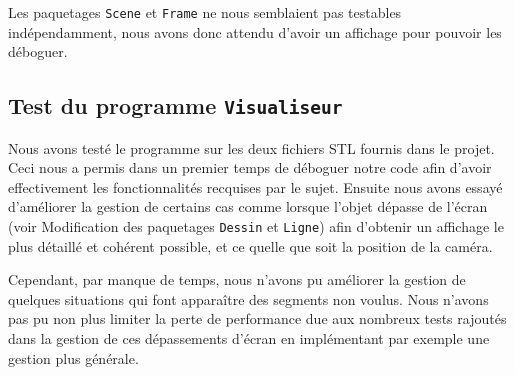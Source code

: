 \documentclass[10pt]{article}
\begin{document}
Les paquetages \lstinline!Scene! et \lstinline!Frame! ne nous semblaient pas testables indépendamment, nous avons donc attendu d'avoir un affichage pour pouvoir les déboguer.

\subsection{Test du programme \lstinline!Visualiseur!}

Nous avons testé le programme sur les deux fichiers STL fournis dans le projet. Ceci nous a permis dans un premier temps de déboguer notre code afin d'avoir effectivement les fonctionnalités recquises par le sujet. Ensuite nous avons essayé d'améliorer la gestion de certains cas comme lorsque l'objet dépasse de l'écran (voir Modification des paquetages \lstinline!Dessin! et \lstinline!Ligne!) afin d'obtenir un affichage le plus détaillé et cohérent possible, et ce quelle que soit la position de la caméra.

Cependant, par manque de temps, nous n'avons pu améliorer la gestion de quelques situations qui font apparaître des segments non voulus. Nous n'avons pas pu non plus limiter la perte de performance due aux nombreux tests rajoutés dans la gestion de ces dépassements d'écran en implémentant par exemple une gestion plus générale.

\end{document}
